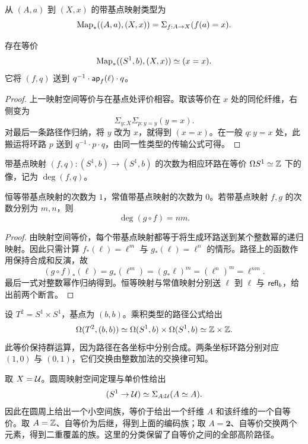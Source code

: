\begin{definition}[带基点映射]
从 $(A,a)$ 到 $(X,x)$ 的带基点映射类型为
\[
 \operatorname{Map}_*((A,a),(X,x))
 =\Sigma_{f:A\to X}(f(a)=x).
\]
\end{definition}

\begin{proposition}
存在等价
\[
 \operatorname{Map}_*((S^1,b),(X,x))\simeq(x=x).
\]
它将 $(f,q)$ 送到 $q^{-1}\cdot\mathsf{ap}_f(\ell)\cdot q$。
\end{proposition}
\begin{proof}
上一映射空间等价与在基点处评价相容。取该等价在 $x$ 处的同伦纤维，右侧变为
\[
 \Sigma_{y:X}\Sigma_{p:y=y}(y=x).
\]
对最后一条路径作归纳，将 $y$ 改为 $x$，就得到 $(x=x)$。在一般 $q:y=x$ 处，此搬运将环路 $p$ 送到 $q^{-1}\cdot p\cdot q$，由同一性类型的传输公式可得。
\end{proof}

\begin{definition}[圆周映射的次数]
带基点映射 $(f,q):(S^1,b)\to(S^1,b)$ 的次数为相应环路在等价 $\Omega S^1\simeq\mathbb Z$ 下的像，记为 $\deg(f,q)$。
\end{definition}

\begin{proposition}[次数的乘法公式]
恒等带基点映射的次数为 $1$，常值带基点映射的次数为 $0$。若带基点映射 $f,g$ 的次数分别为 $m,n$，则
\[
 \deg(g\circ f)=nm.
\]
\end{proposition}
\begin{proof}
由映射空间等价，每个带基点映射都等于将生成环路送到某个整数幂的递归映射。因此只需计算 $f_*(\ell)=\ell^m$ 与 $g_*(\ell)=\ell^n$ 的情形。路径上的函数作用保持合成和反演，故
\[
 (g\circ f)_*(\ell)
 =g_*(\ell^m)
 =(g_*\ell)^m
 =(\ell^n)^m
 =\ell^{nm}.
\]
最后一式对整数幂作归纳得到。恒等映射与常值映射分别送 $\ell$ 到 $\ell$ 与 $\mathsf{refl}_b$，给出前两个断言。
\end{proof}

\begin{example}[二维环面]
设 $T^2=S^1\times S^1$，基点为 $(b,b)$。乘积类型的路径公式给出
\[
 \Omega(T^2,(b,b))
 \simeq\Omega(S^1,b)\times\Omega(S^1,b)
 \simeq\mathbb Z\times\mathbb Z.
\]
此等价保持群运算，因为路径在各坐标中分别合成。两条坐标环路分别对应 $(1,0)$ 与 $(0,1)$，它们交换由整数加法的交换律可知。
\end{example}

\begin{example}[圆周上的空间族]
取 $X=\mathcal U$。圆周映射空间定理与单价性给出
\[
 (S^1\to\mathcal U)\simeq\Sigma_{A:\mathcal U}(A\simeq A).
\]
因此在圆周上给出一个小空间族，等价于给出一个纤维 $A$ 和该纤维的一个自等价。取 $A=\mathbb Z$、自等价为后继，得到上面的编码族；取 $A=\mathbf2$、自等价交换两个元素，得到二重覆盖的族。这里的分类保留了自等价之间的全部高阶路径。
\end{example}

